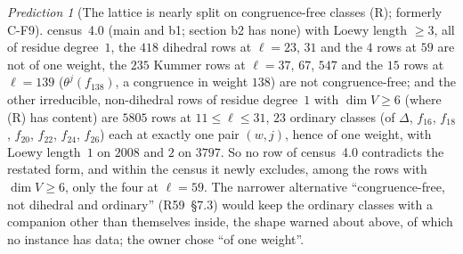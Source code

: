 \documentclass[11pt]{article}
\theoremstyle{remark}
\newtheorem{prediction}[theorem]{Prediction}
\begin{document}
\begin{prediction}[The lattice is nearly split on congruence-free classes (R); formerly C-F9]
census~4.0 (main and b1; section b2 has none) with Loewy length $\ge3$, all of residue degree~$1$, the $418$ dihedral rows at $\ell=23$, $31$ and the $4$
rows at $59$ are not of one weight, the $235$ Kummer rows at $\ell=37$, $67$, $547$ and the $15$ rows at $\ell=139$ ($\theta^{j}(f_{138})$, a congruence
in weight $138$) are not congruence-free; and the other irreducible, non-dihedral rows of residue degree~$1$ with $\dim V\ge6$ (where (R) has content)
are $5805$ rows at $11\le\ell\le31$, $23$ ordinary classes (of $\Delta$, $f_{16}$, $f_{18}$, $f_{20}$, $f_{22}$, $f_{24}$, $f_{26}$) each at exactly one pair
$(w,j)$, hence of one weight, with Loewy length~$1$ on $2008$ and $2$ on $3797$. So no row of census~4.0 contradicts the restated form, and within the
census it newly excludes, among the rows with $\dim V\ge6$, only the four at $\ell=59$. The narrower alternative ``congruence-free, not dihedral and
ordinary'' (R59~\S7.3) would keep the ordinary classes with a companion other than themselves inside, the shape warned about above, of which no instance
has data; the owner chose ``of one weight''.


\end{prediction}
\end{document}
